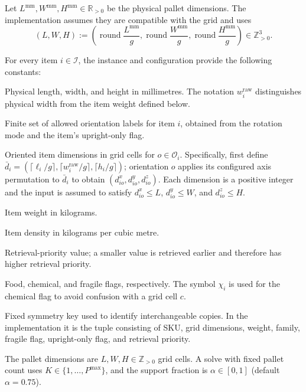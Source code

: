\documentclass[11pt]{article}
\newcommand{\Item}{\mathcal{I}}
\newcommand{\Prio}{\pi}
\begin{document}
Let $L^{\mathrm{mm}},W^{\mathrm{mm}},H^{\mathrm{mm}}\in\mathbb R_{>0}$ be
the physical pallet dimensions.  The implementation assumes they are
compatible with the grid and uses
\begin{equation}
  (L,W,H):=
  \left(\operatorname{round}\frac{L^{\mathrm{mm}}}{g},
        \operatorname{round}\frac{W^{\mathrm{mm}}}{g},
        \operatorname{round}\frac{H^{\mathrm{mm}}}{g}\right)
  \in\mathbb Z_{>0}^3.
  \label{eq:pallet-grid-dimensions}
\end{equation}

For every item $i\in\Item$, the instance and configuration provide the
following constants:
\begin{description}[leftmargin=3.1cm,style=nextline]
  \item[$(\ell_i,w_i^{\mathrm{raw}},h_i)$] Physical length, width, and height
    in millimetres.  The notation $w_i^{\mathrm{raw}}$ distinguishes physical
    width from the item weight defined below.
  \item[$\mathcal O_i$] Finite set of allowed orientation labels for item
    $i$, obtained from the rotation mode and the item's upright-only flag.
  \item[$d_{io}^x,d_{io}^y,d_{io}^z$] Oriented item dimensions in grid cells
    for $o\in\mathcal O_i$.  Specifically, first define
    $\bar d_i=(\lceil\ell_i/g\rceil,\lceil w_i^{\mathrm{raw}}/g\rceil,
    \lceil h_i/g\rceil)$; orientation $o$ applies its configured axis
    permutation to $\bar d_i$ to obtain $(d_{io}^x,d_{io}^y,d_{io}^z)$.
    Each dimension is a positive integer and the input is assumed to satisfy
    $d_{io}^x\le L$, $d_{io}^y\le W$, and $d_{io}^z\le H$.
  \item[$w_i\in\mathbb R_{>0}$] Item weight in kilograms.
  \item[$\rho_i\in\mathbb R_{\ge0}$] Item density in kilograms per cubic
    metre.
  \item[$\Prio_i\in\mathbb Z$] Retrieval-priority value; a smaller value is
    retrieved earlier and therefore has higher retrieval priority.
  \item[$f_i,\chi_i,\varphi_i\in\{0,1\}$] Food, chemical, and fragile flags,
    respectively.  The symbol $\chi_i$ is used for the chemical flag to avoid
    confusion with a grid cell $c$.
  \item[$\kappa_i$] Fixed symmetry key used to identify interchangeable
    copies.  In the implementation it is the tuple consisting of SKU, grid
    dimensions, weight, family, fragile flag, upright-only flag, and retrieval
    priority.
\end{description}
The pallet dimensions are $L,W,H\in\mathbb Z_{>0}$ grid cells.  A solve with
fixed pallet count uses $K\in\{1,\ldots,P^{\max}\}$, and the support fraction
is $\alpha\in[0,1]$ (default $\alpha=0.75$).
\end{document}
